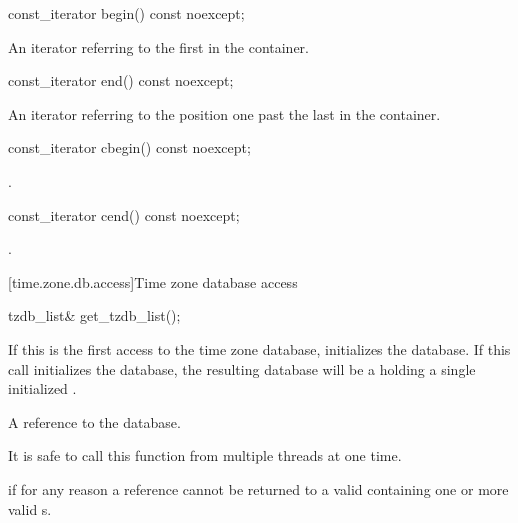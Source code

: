 %
\begin{itemdecl}
const_iterator begin() const noexcept;
\end{itemdecl}

\begin{itemdescr}
\pnum
\returns
An iterator referring to the first  in the container.
\end{itemdescr}

%
\begin{itemdecl}
const_iterator end() const noexcept;
\end{itemdecl}

\begin{itemdescr}
\pnum
\returns
An iterator referring to the position one past the last  in the container.
\end{itemdescr}

%
\begin{itemdecl}
const_iterator cbegin() const noexcept;
\end{itemdecl}

\begin{itemdescr}
\pnum
\returns
{}.
\end{itemdescr}

%
\begin{itemdecl}
const_iterator cend() const noexcept;
\end{itemdecl}

\begin{itemdescr}
\pnum
\returns
{}.
\end{itemdescr}

[time.zone.db.access]{Time zone database access}

%
\begin{itemdecl}
tzdb_list& get_tzdb_list();
\end{itemdecl}

\begin{itemdescr}
\pnum
\effects
If this is the first access to the time zone database,
initializes the database.
If this call initializes the database,
the resulting database will be a 
holding a single initialized .

\pnum
\returns
A reference to the database.

\pnum
\remarks
It is safe to call this function from multiple threads at one time.

\pnum
\throws
{} if for any reason
a reference cannot be returned to a valid 
containing one or more valid s.
\end{itemdescr}

